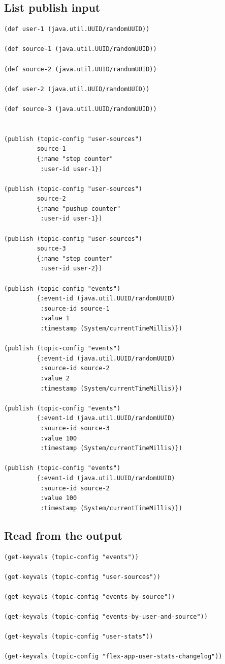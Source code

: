 \documentclass[11pt]{article}
\begin{document}
\subsection{List publish input}
\label{sec:org51993a0}
\begin{verbatim}
(def user-1 (java.util.UUID/randomUUID))

(def source-1 (java.util.UUID/randomUUID))

(def source-2 (java.util.UUID/randomUUID))

(def user-2 (java.util.UUID/randomUUID))

(def source-3 (java.util.UUID/randomUUID))


(publish (topic-config "user-sources")
         source-1
         {:name "step counter"
          :user-id user-1})

(publish (topic-config "user-sources")
         source-2
         {:name "pushup counter"
          :user-id user-1})

(publish (topic-config "user-sources")
         source-3
         {:name "step counter"
          :user-id user-2})

(publish (topic-config "events")
         {:event-id (java.util.UUID/randomUUID)
          :source-id source-1
          :value 1
          :timestamp (System/currentTimeMillis)})

(publish (topic-config "events")
         {:event-id (java.util.UUID/randomUUID)
          :source-id source-2
          :value 2
          :timestamp (System/currentTimeMillis)})

(publish (topic-config "events")
         {:event-id (java.util.UUID/randomUUID)
          :source-id source-3
          :value 100
          :timestamp (System/currentTimeMillis)})

(publish (topic-config "events")
         {:event-id (java.util.UUID/randomUUID)
          :source-id source-2
          :value 100
          :timestamp (System/currentTimeMillis)})

\end{verbatim}

\subsection{Read from the output}
\label{sec:org15da23f}
\begin{verbatim}
(get-keyvals (topic-config "events"))

(get-keyvals (topic-config "user-sources"))

(get-keyvals (topic-config "events-by-source"))

(get-keyvals (topic-config "events-by-user-and-source"))

(get-keyvals (topic-config "user-stats"))

(get-keyvals (topic-config "flex-app-user-stats-changelog"))

\end{verbatim}
\end{document}
